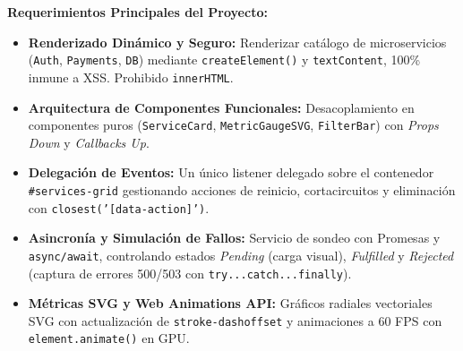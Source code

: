 \documentclass[10pt,letterpaper]{article}
\begin{document}
\textbf{Requerimientos Principales del Proyecto:}
\begin{itemize}[leftmargin=*,itemsep=1.5pt,topsep=2pt]
  \item \textbf{Renderizado Dinámico y Seguro:} Renderizar catálogo de microservicios (\texttt{Auth}, \texttt{Payments}, \texttt{DB}) mediante \texttt{createElement()} y \texttt{textContent}, 100\% inmune a XSS. Prohibido \texttt{innerHTML}.
  \item \textbf{Arquitectura de Componentes Funcionales:} Desacoplamiento en componentes puros (\texttt{ServiceCard}, \texttt{MetricGaugeSVG}, \texttt{FilterBar}) con \textit{Props Down} y \textit{Callbacks Up}.
  \item \textbf{Delegación de Eventos:} Un único listener delegado sobre el contenedor \texttt{\#services-grid} gestionando acciones de reinicio, cortacircuitos y eliminación con \texttt{closest('[data-action]')}.
  \item \textbf{Asincronía y Simulación de Fallos:} Servicio de sondeo con Promesas y \texttt{async/await}, controlando estados \textit{Pending} (carga visual), \textit{Fulfilled} y \textit{Rejected} (captura de errores 500/503 con \texttt{try...catch...finally}).
  \item \textbf{Métricas SVG y Web Animations API:} Gráficos radiales vectoriales SVG con actualización de \texttt{stroke-dashoffset} y animaciones a 60 FPS con \texttt{element.animate()} en GPU.
\end{itemize}

\vspace{0.10cm}
\end{document}
